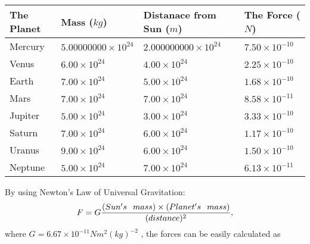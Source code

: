 \documentclass[12pt]{article}
\begin{document}
 
\begin{tabular}{|l|l|l|l|}
\hline
The Planet & Mass ($kg$) & Distanace from Sun ($m$) & The Force ($N$)\\
\hline
Mercury  &
           $ %
5.00000000 \times 10^{24} $   &
             $ %
2.000000000 \times 10^{24} $    & $ %
7.50 \times 10^{-10} $
\\  \hline
Venus    &
           $  %
6.00 \times 10^{24}  $     &
             $ %
4.00 \times 10^{24} $    & $ %
2.25 \times 10^{-10} $
\\  \hline
Earth    &
           $  %
7.00 \times 10^{24}  $     &
             $ %
5.00 \times 10^{24} $    & $ %
1.68 \times 10^{-10} $
\\   \hline
Mars     &
           $  %
7.00 \times 10^{24} $     &
             $ %
7.00 \times 10^{24} $    & $ %
8.58 \times 10^{-11} $
\\   \hline
Jupiter  &
           $  %
5.00 \times 10^{24} $    &
             $ %
3.00 \times 10^{24} $    & $ %
3.33 \times 10^{-10} $
\\  \hline
Saturn   &
           $  %
7.00 \times 10^{24} $    &
             $ %
6.00 \times 10^{24}  $    & $ %
1.17 \times 10^{-10} $
\\  \hline
Uranus   &
           $  %
9.00 \times 10^{24} $    &
             $ %
6.00 \times 10^{24} $    & $ %
1.50 \times 10^{-10} $
\\  \hline
Neptune  &
           $  %
5.00 \times 10^{24} $    &
             $ %
7.00 \times 10^{24} $    & $ %
6.13 \times 10^{-11} $
\\  \hline
 
\end{tabular}
 
 
 
 
\noindent{}
 
 

 
 
 
 
\noindent{}
 
 

By using Newton's Law of Universal Gravitation:
\[
F=G \frac{(Sun's \hspace{0.1in} mass) \times (Planet's \hspace{0.1in} mass)} { (distance)^2},
\]
where
$ G= %
6.67 \times 10^{-11} N m^{2}(kg)^{-2}$ , the forces can be easily calculated as
 
\end{document}
